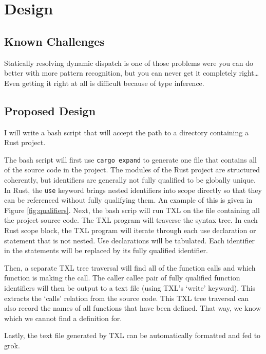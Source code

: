 \documentclass[11pt]{article}
\begin{document}
\section{Design}

\subsection{Known Challenges}
Statically resolving dynamic dispatch is one of those problems were you can do better with more pattern recognition, but you can never get it completely right\dots
Even getting it right at all is difficult because of type inference.

\subsection{Proposed Design}

I will write a bash script that will accept the path to a directory containing a Rust project.

The bash script will first use \lstinline{cargo expand} to generate one file that contains all of the source code in the project.
The modules of the Rust project are structured coherently, but identifiers are generally not fully qualified to be globally unique.
In Rust, the \lstinline{use} keyword brings nested identifiers into scope directly so that they can be referenced without fully qualifying them.
An example of this is given in Figure \ref{fig:qualifiers}.
Next, the bash scrip will run TXL on the file containing all the project source code.
The TXL program will traverse the syntax tree.
In each Rust scope block, the TXL program will iterate through each use declaration or statement that is not nested.
Use declarations will be tabulated.
Each identifier in the statements will be replaced by its fully qualified identifier.

Then, a separate TXL tree traversal will find all of the function calls and which function is making the call.
The caller callee pair of fully qualified function identifiers will then be output to a text file (using TXL's `write' keyword).
This extracts the `calls' relation from the source code.
This TXL tree traversal can also record the names of all functions that have been defined.
That way, we know which we cannot find a definition for.

Lastly, the text file generated by TXL can be automatically formatted and fed to grok.
\end{document}

